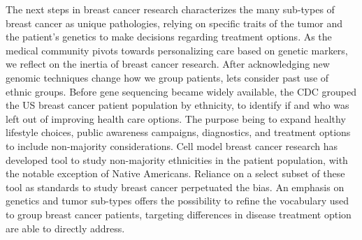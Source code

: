 \documentclass[11pt]{article}
\begin{document}
The next steps in breast cancer research characterizes the many sub-types of breast cancer as unique pathologies, relying on specific traits of the tumor and the patient's genetics to make decisions regarding treatment options. As the medical community pivots towards personalizing care based on genetic markers, we reflect on the inertia of breast cancer research. After acknowledging new genomic techniques change how we group patients, lets consider past use of ethnic groups. Before gene sequencing became widely available, the CDC grouped the US breast cancer patient population by ethnicity, to identify if and who was left out of improving health care options. The purpose being to expand healthy lifestyle choices, public awareness campaigns, diagnostics, and treatment options to include non-majority considerations. Cell model breast cancer research has developed tool to study non-majority ethnicities in the patient population, with the notable exception of Native Americans. Reliance on a select subset of these tool as standards to study breast cancer perpetuated the bias. An emphasis on genetics and tumor sub-types offers the possibility to refine the vocabulary used to group breast cancer patients, targeting differences in disease treatment option are able to directly address. 



\end{document}

